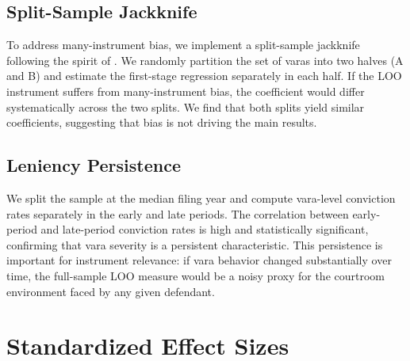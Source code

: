 \documentclass[12pt]{article}
\begin{document}
\subsection{Split-Sample Jackknife}

To address many-instrument bias, we implement a split-sample jackknife following the spirit of \citet{hull2025}. We randomly partition the set of varas into two halves (A and B) and estimate the first-stage regression separately in each half. If the LOO instrument suffers from many-instrument bias, the coefficient would differ systematically across the two splits. We find that both splits yield similar coefficients, suggesting that bias is not driving the main results.

\subsection{Leniency Persistence}

We split the sample at the median filing year and compute vara-level conviction rates separately in the early and late periods. The correlation between early-period and late-period conviction rates is high and statistically significant, confirming that vara severity is a persistent characteristic. This persistence is important for instrument relevance: if vara behavior changed substantially over time, the full-sample LOO measure would be a noisy proxy for the courtroom environment faced by any given defendant.

\section{Standardized Effect Sizes}
\label{sec:sde}


\end{document}
